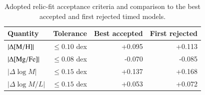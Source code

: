 \begin{table}
\centering
\caption{Adopted relic-fit acceptance criteria and comparison to the best accepted and first rejected timed models.}
\label{tab:acceptance}
\begin{tabular}{lrrr}
\toprule
Quantity & Tolerance & Best accepted & First rejected \\
\midrule
$|\Delta[\mathrm{M}/\mathrm{H}]|$ & $\leq 0.10$ dex & +0.095 & +0.113 \\
$|\Delta[\mathrm{Mg}/\mathrm{Fe}]|$ & $\leq 0.08$ dex & -0.070 & -0.085 \\
$|\Delta\log M|$ & $\leq 0.15$ dex & +0.137 & +0.168 \\
$|\Delta\log M/L|$ & $\leq 0.15$ dex & +0.053 & +0.072 \\
\bottomrule
\end{tabular}
\end{table}
